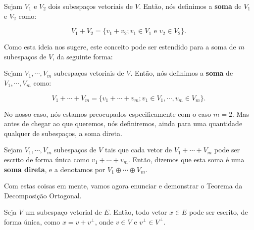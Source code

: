 \begin{Definition}
	Sejam $V_1$ e $V_2$ dois subespaços vetoriais de $V$. Então, nós definimos a \textbf{soma} de $V_1$ e $V_2$ como:
	
	$$
	V_1 + V_2 = \{v_1 + v_2; v_1\in V_1 \text{ e } v_2\in V_2\}.
	$$
\end{Definition}

Como esta ideia nos sugere, este conceito pode ser estendido para a soma de $m$ subespaços de $V$, da seguinte forma:

\begin{Definition}
	Sejam $V_1, \cdots, V_m$ subespaços vetoriais de $V$. Então, nós definimos a \textbf{soma} de $V_1, \cdots, V_m$ como:
	
	$$
	V_1 + \cdots + V_m = \{v_1 + \cdots + v_m; v_1\in V_1, \cdots, v_m\in V_m\}.
	$$
\end{Definition}

No nosso caso, nós estamos preocupados especificamente com o caso $m = 2$. Mas antes de chegar ao que queremos, nós definiremos, ainda para uma quantidade qualquer de subespaços, a soma direta.

\begin{Definition}
	Sejam $V_1, \cdots, V_m$ subespaços de $V$ tais que cada vetor de $V_1 + \cdots + V_m$ pode ser escrito de forma única como $v_1 + \cdots + v_m$. Então, dizemos que esta soma é uma \textbf{soma direta}, e a denotamos por $V_1\oplus\cdots\oplus V_m$.
\end{Definition}

Com estas coisas em mente, vamos agora enunciar e demonstrar o Teorema da Decomposição Ortogonal.

\begin{Theorem}
	Seja $V$ um subespaço vetorial de $E$. Então, todo vetor $x\in E$ pode ser escrito, de forma única, como $x = v + v^\perp$, onde $v\in V$ e $v^\perp\in V^\perp$.
\end{Theorem}

